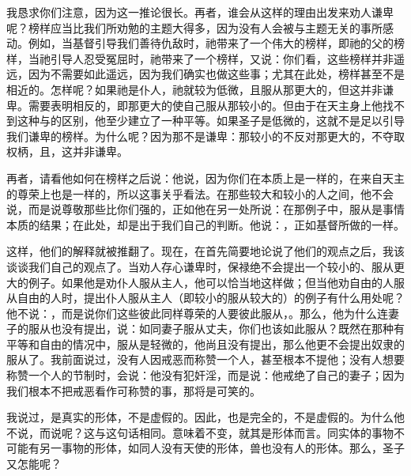 我恳求你们注意，因为这一推论很长。再者，谁会从这样的理由出发来劝人谦卑呢？榜样应当比我们所劝勉的主题大得多，因为没有人会被与主题无关的事所感动。例如，当基督引导我们善待仇敌时，祂带来了一个伟大的榜样，即祂的父的榜样，当祂引导人忍受冤屈时，祂带来了一个榜样，又说：你们看，这些榜样并非遥远，因为不需要如此遥远，因为我们确实也做这些事；尤其在此处，榜样甚至不是相近的。怎样呢？如果祂是仆人，祂就较为低微，且服从那更大的，但这并非谦卑。需要表明相反的，即那更大的使自己服从那较小的。但由于在天主身上他找不到这种与的区别，他至少建立了一种平等。如果圣子是低微的，这就不是足以引导我们谦卑的榜样。为什么呢？因为那不是谦卑：那较小的不反对那更大的，不夺取权柄，且，这并非谦卑。\par

再者，请看他如何在榜样之后说：他说，因为你们在本质上是一样的，在来自天主的尊荣上也是一样的，所以这事关乎看法。在那些较大和较小的人之间，他不会说，而是说尊敬那些比你们强的，正如他在另一处所说：在那例子中，服从是事情本质的结果；在此处，却是出于我们自己的判断。他说：，正如基督所做的一样。\par

这样，他们的解释就被推翻了。现在，在首先简要地论说了他们的观点之后，我该谈谈我们自己的观点了。当劝人存心谦卑时，保禄绝不会提出一个较小的、服从更大的例子。如果他是劝仆人服从主人，他可以恰当地这样做；但当他劝自由的人服从自由的人时，提出仆人服从主人（即较小的服从较大的）的例子有什么用处呢？他不说：，而是说你们这些彼此同样尊荣的人要彼此服从，。那么，他为什么连妻子的服从也没有提出，说：如同妻子服从丈夫，你们也该如此服从？既然在那种有平等和自由的情况中，服从是轻微的，他尚且没有提出，那么他更不会提出奴隶的服从了。我前面说过，没有人因戒恶而称赞一个人，甚至根本不提他；没有人想要称赞一个人的节制时，会说：他没有犯奸淫，而是说：他戒绝了自己的妻子；因为我们根本不把戒恶看作可称赞的事，那将是可笑的。\par

我说过，是真实的形体，不是虚假的。因此，也是完全的，不是虚假的。为什么他不说，而说呢？这与这句话相同。意味着不变，就其是形体而言。同实体的事物不可能有另一事物的形体，如同人没有天使的形体，兽也没有人的形体。那么，圣子又怎能呢？\par

